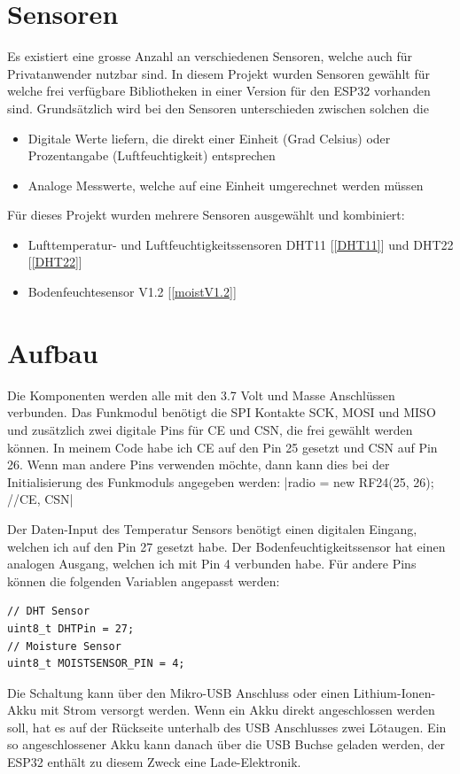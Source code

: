 \documentclass[
  12pt, %
  a4paper, %
  twoside, %
  openany, %
  numbers=noenddot, %
  BCOR=5mm, %
  parskip=half*, %
  thesis, %
]{bfhbook}
\begin{document}
\section{Sensoren}
 Es existiert eine grosse Anzahl an verschiedenen Sensoren, welche auch für Privatanwender nutzbar sind. In diesem Projekt wurden Sensoren gewählt für welche frei verfügbare Bibliotheken in einer Version für den ESP32 vorhanden sind. Grundsätzlich wird bei den Sensoren unterschieden zwischen solchen die 
 \begin{itemize}
	 \item Digitale Werte liefern, die direkt einer Einheit (Grad Celsius) oder Prozentangabe (Luftfeuchtigkeit) entsprechen
	  \item Analoge Messwerte, welche auf eine Einheit umgerechnet werden müssen
\end{itemize}
Für dieses Projekt wurden mehrere Sensoren ausgewählt und kombiniert:
\begin{itemize}
	\item Lufttemperatur- und Luftfeuchtigkeitssensoren DHT11 [\ref{DHT11}] und DHT22 [\ref{DHT22}]
	\item Bodenfeuchtesensor V1.2 [\ref{moistV1.2}]
\end{itemize}
\section{Aufbau}
Die Komponenten werden alle mit den 3.7 Volt und Masse Anschlüssen verbunden. Das Funkmodul benötigt die SPI Kontakte SCK, MOSI und MISO und zusätzlich zwei digitale Pins für CE und CSN, die frei gewählt werden können. In meinem Code habe ich CE auf den Pin 25 gesetzt und CSN auf Pin 26. Wenn man andere Pins verwenden möchte, dann kann dies bei der Initialisierung des Funkmoduls angegeben werden: |radio = new RF24(25, 26); //CE, CSN|

Der Daten-Input des Temperatur Sensors benötigt einen digitalen Eingang, welchen ich auf den Pin 27 gesetzt habe. Der Bodenfeuchtigkeitssensor hat einen analogen Ausgang, welchen ich mit Pin 4 verbunden habe. Für andere Pins können die folgenden Variablen angepasst werden:
\begin{verbatim}
// DHT Sensor
uint8_t DHTPin = 27;
// Moisture Sensor
uint8_t MOISTSENSOR_PIN = 4;
\end{verbatim}
Die Schaltung kann über den Mikro-USB Anschluss oder einen Lithium-Ionen-Akku mit Strom versorgt werden. Wenn ein Akku direkt angeschlossen werden soll, hat es auf der Rückseite  unterhalb des USB Anschlusses zwei Lötaugen. Ein so angeschlossener Akku kann danach über die USB Buchse geladen werden, der ESP32 enthält zu diesem Zweck eine Lade-Elektronik.
\end{document}
